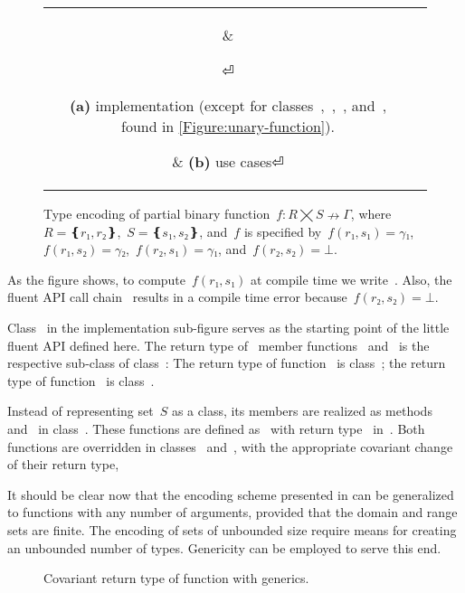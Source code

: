 \begin{figure}[hbt]
  \caption{\label{Figure:simple-binary}%
    Type encoding of partial binary function~$f:R⨉S↛Γ$,
    where~$R=❴r₁,r₂❵$,~$S=❴s₁,s₂❵$, and~$f$
    is specified by~$f(r₁,s₁)=γ₁$,~$f(r₁,s₂)=γ₂$,~$f(r₂,s₁)=γ₁$, and~$f(r₂, s₂)=⊥$.}
  \begin{tabular}{cc}
    \hspace{-3.5ex}
    \parbox[c]{0.57\linewidth}{%
    }
      &
    \hspace{-16ex}
    \parbox[c]{51ex}{}
⏎
    \parbox{0.57\linewidth}
    {\textbf{(a)} implementation (except for classes~,~,~, and~,
    found in \cref{Figure:unary-function}).}
      & \hspace{-5ex}\textbf{(b)} use cases⏎
  \end{tabular}
\end{figure}

As the figure shows, to compute~$f(r₁,s₁)$ at compile time we write~.
Also, the fluent API call chain~ results in a compile time
  error because~$f(r₂, s₂)=⊥$.

Class~ in the implementation sub-figure serves as
  the starting point of the little fluent API defined here.
The return type of~ member functions~ and~
  is the respective sub-class of class~:
The return type of function~ is class~;
  the return type of function~ is class~.

Instead of representing set~$S$ as a class,
  its members are realized as methods~ and~ in class~.
These functions are defined as~ with return type~
  in~.
Both functions are overridden in classes~ and~,
   with the appropriate covariant change of their return type,

It should be clear now that the encoding scheme presented
  in  can be generalized to functions
  with any number of arguments, provided that the domain and range sets are finite.
The encoding of sets of unbounded size require means for creating an unbounded
 number of types.
Genericity can be employed to serve this end.

\begin{wrapfigure}[8]{r}{31ex}
  \caption{\label{Figure:id}%
  Covariant return type of function 
  with \Java generics.
  }
\end{wrapfigure}

